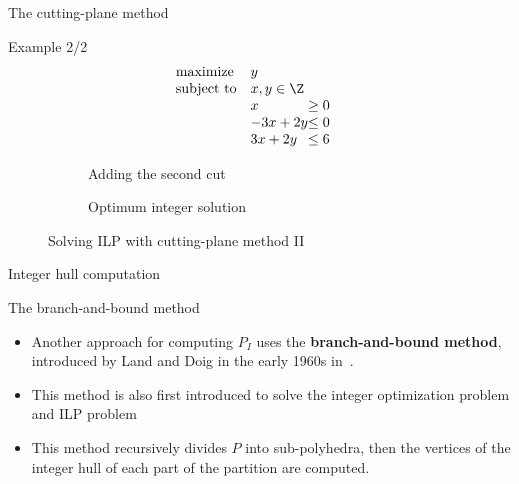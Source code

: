 \begin{frame}{The cutting-plane method}
	\begin{block}{Example 2/2}
		\begin{equation}
			\begin{array}{ll@{}ll}
				\text{maximize}  & \displaystyle y & &\\
				\text{subject to}& x,y \in \Z &&\\
				&x &\ge 0&\\
				& -3x + 2y &\le 0 &\\
				& 3x + 2y &\le 6&	
			\end{array}
			\label{eq:ilp}
		\end{equation}
		\begin{figure}[htb]
			\centering %
			\begin{subfigure}{0.5\textwidth}
				\resizebox{\linewidth}{!}{}
				\caption{Adding the second cut}
				\label{fig:cut2}
			\end{subfigure}\hfil %
			\begin{subfigure}{0.5\textwidth}
				\resizebox{\linewidth}{!}{}
				\caption{Optimum integer solution}
				\label{fig:cut3}
			\end{subfigure}
			\caption{Solving ILP with cutting-plane method II}
			\label{fig:cut_1}
		\end{figure}
	\end{block}
\end{frame}

\begin{frame}{Integer hull computation}
	\begin{block}{The branch-and-bound method}
		\begin{itemize}
			\item Another approach for computing $P_I$ uses the {\bf branch-and-bound
				method}, introduced by Land and Doig in the early 1960s
			in~\cite{land1960automatic}.
			\item This method is also first introduced to solve the integer optimization problem and ILP problem
			\item This method recursively divides $P$ into
			sub-polyhedra, then the vertices of the integer hull of each part of the
			partition are computed.
		\end{itemize}
	\end{block}
\end{frame}


